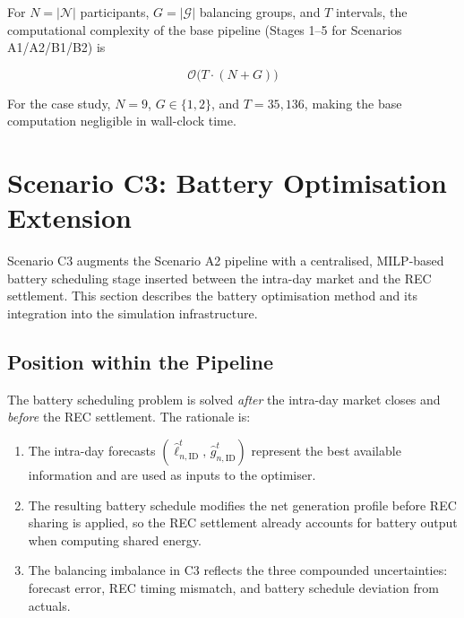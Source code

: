 \documentclass[12pt,a4paper]{article}
\begin{document}
For $N = |\mathcal{N}|$ participants, $G = |\mathcal{G}|$ balancing groups,
and $T$ intervals, the computational complexity of the base pipeline (Stages
1--5 for Scenarios A1/A2/B1/B2) is

\begin{equation}
\mathcal{O}\bigl(T \cdot (N + G)\bigr)
\label{eq:complexity_base}
\end{equation}

For the case study, $N = 9$, $G \in \{1, 2\}$, and $T = 35{,}136$, making the
base computation negligible in wall-clock time.

\section{Scenario C3: Battery Optimisation Extension}
\label{sec:scenario_c3}

Scenario C3 augments the Scenario A2 pipeline with a centralised, MILP-based
battery scheduling stage inserted between the intra-day market and the REC
settlement.  This section describes the battery optimisation method and its
integration into the simulation infrastructure.

\subsection{Position within the Pipeline}
\label{subsec:battery_position}

The battery scheduling problem is solved \emph{after} the intra-day market
closes and \emph{before} the REC settlement.  The rationale is:

\begin{enumerate}[leftmargin=2.5em]
  \item The intra-day forecasts
        $(\hat{\ell}_{n,\mathrm{ID}}^{t},\, \hat{g}_{n,\mathrm{ID}}^{t})$
        represent the best available information and are used as inputs to the
        optimiser.
  \item The resulting battery schedule modifies the net generation profile
        before REC sharing is applied, so the REC settlement already accounts
        for battery output when computing shared energy.
  \item The balancing imbalance in C3 reflects the three compounded
        uncertainties: forecast error, REC timing mismatch, and battery
        schedule deviation from actuals.
\end{enumerate}
\end{document}
